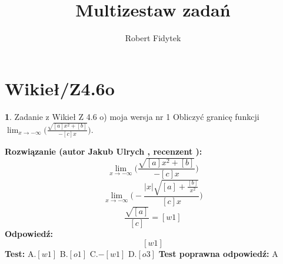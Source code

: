 \documentclass[12pt, a4paper]{article}
\title{Multizestaw zadań}
\author{Robert Fidytek}
\date{}
\theoremstyle{definition} %
\newtheorem{zad}{}
\newcommand{\kategoria}[1]{\section{#1}} %
\newcommand{\zadStart}[1]{\begin{zad}#1\newline} %
\newcommand{\zadStop}{\end{zad}}   %
\newcommand{\rozwStart}[2]{\noindent \textbf{Rozwiązanie (autor #1 , recenzent #2): }\newline} %
\newcommand{\rozwStop}{\newline}                                            %
\newcommand{\odpStart}{\noindent \textbf{Odpowiedź:}\newline}    %
\newcommand{\odpStop}{\newline}                                             %
\newcommand{\testStart}{\noindent \textbf{Test:}\newline} %
\newcommand{\testStop}{\newline} %
\newcommand{\kluczStart}{\noindent \textbf{Test poprawna odpowiedź:}\newline} %
\newcommand{\kluczStop}{\newline} %
\begin{document}
\maketitle


\kategoria{Wikieł/Z4.6o}
\zadStart{Zadanie z Wikieł Z 4.6 o) moja wersja nr 1}
Obliczyć granicę funkcji $\lim_{x \to -\infty}\bigg(\frac{\sqrt{[a]x^{2}+[b]}}{-[c]x}\bigg)$.
\zadStop
\rozwStart{Jakub Ulrych}{}
$$\lim_{x \to -\infty}\bigg(\frac{\sqrt{[a]x^{2}+[b]}}{-[c]x}\bigg)$$
$$\lim_{x \to -\infty}\bigg(-\frac{|x|\sqrt{[a]+\frac{[b]}{x^{2}}}}{[c]x}\bigg)$$
$$\frac{\sqrt{[a]}}{[c]}=[w1]$$
\rozwStop
\odpStart
$$[w1]$$
\odpStop
\testStart
A.$[w1]$
B.$[o1]$
C.$-[w1]$
D.$[o3]$
\testStop
\kluczStart
A
\kluczStop
\end{document}
